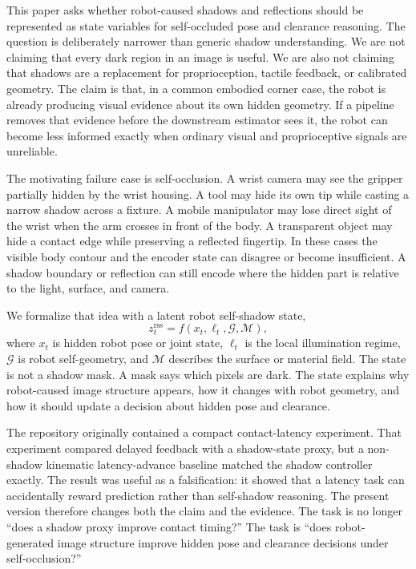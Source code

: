\documentclass{article}
\newcommand{\rss}{z^{\mathrm{rss}}}
\newcommand{\pose}{x}
\newcommand{\illum}{\ell}
\newcommand{\geom}{\mathcal{G}}
\begin{document}
This paper asks whether robot-caused shadows and reflections should be represented as state variables for self-occluded pose and clearance reasoning. The question is deliberately narrower than generic shadow understanding. We are not claiming that every dark region in an image is useful. We are also not claiming that shadows are a replacement for proprioception, tactile feedback, or calibrated geometry. The claim is that, in a common embodied corner case, the robot is already producing visual evidence about its own hidden geometry. If a pipeline removes that evidence before the downstream estimator sees it, the robot can become less informed exactly when ordinary visual and proprioceptive signals are unreliable.

The motivating failure case is self-occlusion. A wrist camera may see the gripper partially hidden by the wrist housing. A tool may hide its own tip while casting a narrow shadow across a fixture. A mobile manipulator may lose direct sight of the wrist when the arm crosses in front of the body. A transparent object may hide a contact edge while preserving a reflected fingertip. In these cases the visible body contour and the encoder state can disagree or become insufficient. A shadow boundary or reflection can still encode where the hidden part is relative to the light, surface, and camera.

We formalize that idea with a latent robot self-shadow state,
\[
\rss_t = f(\pose_t,\illum_t,\geom,\mathcal{M}),
\]
where $\pose_t$ is hidden robot pose or joint state, $\illum_t$ is the local illumination regime, $\geom$ is robot self-geometry, and $\mathcal{M}$ describes the surface or material field. The state is not a shadow mask. A mask says which pixels are dark. The state explains why robot-caused image structure appears, how it changes with robot geometry, and how it should update a decision about hidden pose and clearance.

The repository originally contained a compact contact-latency experiment. That experiment compared delayed feedback with a shadow-state proxy, but a non-shadow kinematic latency-advance baseline matched the shadow controller exactly. The result was useful as a falsification: it showed that a latency task can accidentally reward prediction rather than self-shadow reasoning. The present version therefore changes both the claim and the evidence. The task is no longer ``does a shadow proxy improve contact timing?'' The task is ``does robot-generated image structure improve hidden pose and clearance decisions under self-occlusion?''
\end{document}
